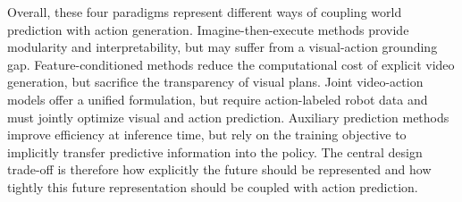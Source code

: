 Overall, these four paradigms represent different ways of coupling world prediction with action generation. Imagine-then-execute methods provide modularity and interpretability, but may suffer from a visual-action grounding gap. Feature-conditioned methods reduce the computational cost of explicit video generation, but sacrifice the transparency of visual plans. Joint video-action models offer a unified formulation, but require action-labeled robot data and must jointly optimize visual and action prediction. Auxiliary prediction methods improve efficiency at inference time, but rely on the training objective to implicitly transfer predictive information into the policy. The central design trade-off is therefore how explicitly the future should be represented and how tightly this future representation should be coupled with action prediction.

